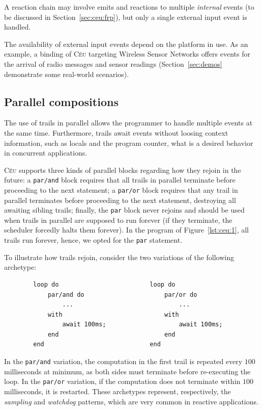 \documentclass[11pt,a4paper]{article}
\newcommand{\2}{\;\;}
\newcommand{\5}{\;\;\;\;\;}
\newcommand{\CEU}{\textsc{C\'{e}u}}
\newcommand{\code}[1] {{\small{\texttt{#1}}}}
\begin{document}
A reaction chain may involve emits and reactions to multiple \emph{internal} 
events (to be discussed in Section~\ref{sec:ceu:frp}), but only a single 
external input event is handled.

The availability of external input events depend on the platform in 
use.
As an example, a binding of \CEU{} targeting Wireless Sensor Networks offers 
events for the arrival of radio messages and sensor readings 
(Section~\ref{sec:demos} demonstrate some real-world scenarios).

\subsection{Parallel compositions}
\label{sec:ceu:par}

The use of trails in parallel allows the programmer to handle multiple events 
at the same time.
Furthermore, trails await events without loosing context information, such as 
locals and the program counter, what is a desired behavior in concurrent 
applications.~\cite{sync_async.cooperative}

\CEU{} supports three kinds of parallel blocks regarding how they rejoin in the 
future:
a \code{par/and} block requires that all trails in parallel terminate before 
proceeding to the next statement;
a \code{par/or} block requires that any trail in parallel terminates before 
proceeding to the next statement, destroying all awaiting sibling trails;
finally, the \code{par} block never rejoins and should be used when trails in 
parallel are supposed to run forever (if they terminate, the scheduler forcedly 
halts them forever).
In the program of Figure~\ref{lst:ceu:1}, all trails run forever, hence, we 
opted for the \code{par} statement.

To illustrate how trails rejoin, consider the two variations of the following 
archetype:
{\small
\begin{verbatim}
        loop do                         loop do
            par/and do                      par/or do
                ...                             ...
            with                            with
                await 100ms;                    await 100ms;
            end                             end
        end                             end
\end{verbatim}
}
In the \code{par/and} variation, the computation in the first trail is repeated 
every $100$ milliseconds at minimum, as both sides must terminate before 
re-executing the loop.
In the \code{par/or} variation, if the computation does not terminate within 
$100$ milliseconds, it is restarted.
These archetypes represent, respectively, the \emph{sampling} and 
\emph{watchdog} patterns, which are very common in reactive applications.
\end{document}
